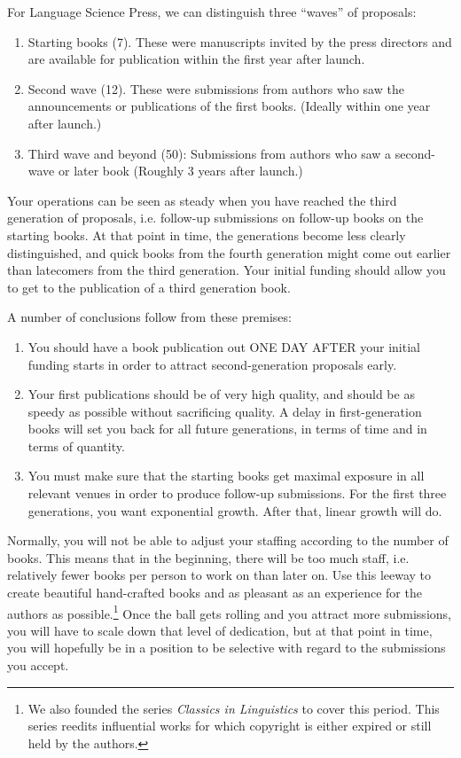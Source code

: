 \documentclass[nonflat,smallfont
]{langsci/langscibook}
\begin{document}
For Language Science Press, we can distinguish three ``waves'' of proposals: 

\begin{enumerate}
 \item Starting books (7). These were manuscripts invited by the press directors and are available for publication within the first year after launch.
 \item Second wave (12). These were submissions from authors who saw the announcements or publications of the first books. (Ideally within one  year after launch.)
 \item Third wave and beyond (50): Submissions from authors who saw a second-wave or later book (Roughly 3 years after launch.)
\end{enumerate} 

Your operations can be seen as steady when you have reached the third generation of proposals, i.e. follow-up submissions on follow-up books on the starting books. At that point in time, the generations become less clearly distinguished, and quick books from the fourth generation might come out earlier than latecomers from the third generation. Your initial funding should allow you to get to the publication of a third generation book.

A number of conclusions follow from these premises:

\begin{enumerate}
 \item You should have a book publication out ONE DAY AFTER your initial funding starts in order to attract second-generation proposals early. 
 \item Your first publications should be of very high quality, and should be as speedy as possible without sacrificing quality. A delay in first-generation books will set you back for all future generations, in terms of time and in terms of quantity.
 \item You must make sure that the starting books get maximal exposure in all relevant venues in order to produce follow-up submissions. For the first three generations, you want exponential growth. After that, linear growth will do. 
\end{enumerate}

Normally, you will not be able to adjust your staffing according to the number of books. This means that in the beginning, there will be too much staff, i.e. relatively fewer books per person to work on than later on. Use this leeway to create beautiful hand-crafted books and as pleasant as an experience for the authors as possible.\footnote{We also founded the series \textit{Classics in Linguistics} to cover this period. This series reedits influential works for which copyright is either expired or still held by the authors.} Once the ball gets rolling and you attract more submissions, you will have to scale down that level of dedication, but at that point in time, you will hopefully be in a position to be selective with regard to the submissions you accept. 
\end{document}
